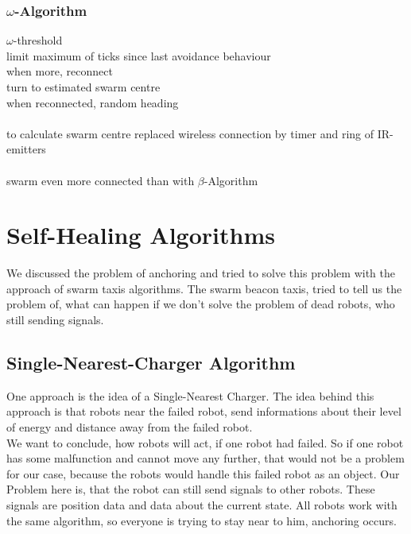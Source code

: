 \documentclass[
	a4paper,
	article,
	pagesize,
	pdftex,
	12pt,
	english,
	fleqn,
	final,
	]{scrartcl}
\begin{document}
\subsubsection{$\omega$-Algorithm}
$\omega$-threshold\\
limit maximum of ticks since last avoidance behaviour\\
when more, reconnect\\
turn to estimated swarm centre\\
when reconnected, random heading\\
\ \\
to calculate swarm centre replaced wireless connection by timer and ring of IR-emitters\\
\ \\
swarm even more connected than with $\beta$-Algorithm
\color{black}

\section{Self-Healing Algorithms}
We discussed the problem of anchoring and tried to solve this problem with the approach of swarm taxis algorithms. The swarm beacon taxis, tried to tell us the problem of, what can happen if we don't solve the problem of dead robots, who still sending signals.

\subsection{Single-Nearest-Charger Algorithm}
One approach is the idea of a Single-Nearest Charger.
The idea behind this approach is that robots near the failed robot, send informations about their level of energy and distance away from the failed robot.\\
We want to conclude, how robots will act, if one robot had failed. So if one robot has some malfunction and cannot move any further, that would not be a problem for our case, because the robots would handle this failed robot as an object. Our Problem here is, that the robot can still send signals to other robots. These signals are position data and data about the current state. All robots work with the same algorithm, so everyone is trying to stay near to him, anchoring occurs. \\
\end{document}
